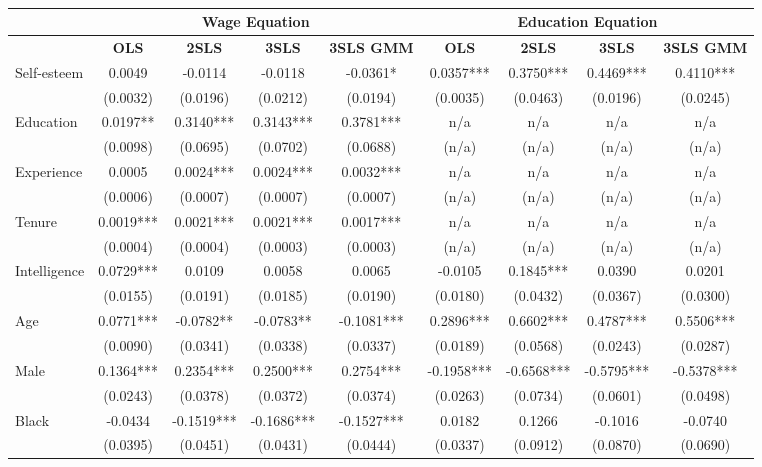 \documentclass[12pt]{report}
\newcommand{\prbf}[1]{\textbf{#1}}
\begin{document}
\begin{sidewaystable}
\small
\caption{\label{tab:wage80b}}
\vspace{2pt}
\centering\begin{tabular}{lc|c|c|c|c|c|c|c}
\hline
\hline
& \multicolumn{4}{|c|}{Wage Equation} & \multicolumn{4}{|c}{Education Equation}\\
\hline
& \prbf{OLS} & \prbf{2SLS} & \prbf{3SLS} & \prbf{3SLS GMM} & \prbf{OLS} & \prbf{2SLS} & \prbf{3SLS} & \prbf{3SLS GMM}\\
\hline
Self-esteem & 0.0049 & -0.0114 & -0.0118 & -0.0361* & 0.0357*** & 0.3750*** & 0.4469*** & 0.4110***\\
& (0.0032) & (0.0196) & (0.0212) & (0.0194) & (0.0035) & (0.0463) & (0.0196) & (0.0245)\\
Education & 0.0197** & 0.3140*** & 0.3143*** & 0.3781*** & n/a & n/a & n/a & n/a\\
& (0.0098) & (0.0695) & (0.0702) & (0.0688) & (n/a) & (n/a) & (n/a) & (n/a)\\
Experience & 0.0005 & 0.0024*** & 0.0024*** & 0.0032*** & n/a & n/a & n/a & n/a\\
& (0.0006) & (0.0007) & (0.0007) & (0.0007) & (n/a) & (n/a) & (n/a) & (n/a)\\
Tenure & 0.0019*** & 0.0021*** & 0.0021*** & 0.0017*** & n/a & n/a & n/a & n/a\\
& (0.0004) & (0.0004) & (0.0003) & (0.0003) & (n/a) & (n/a) & (n/a) & (n/a)\\
Intelligence & 0.0729*** & 0.0109 & 0.0058 & 0.0065 & -0.0105 & 0.1845*** & 0.0390 & 0.0201\\
& (0.0155) & (0.0191) & (0.0185) & (0.0190) & (0.0180) & (0.0432) & (0.0367) & (0.0300)\\
Age & 0.0771*** & -0.0782** & -0.0783** & -0.1081*** & 0.2896*** & 0.6602*** & 0.4787*** & 0.5506***\\
& (0.0090) & (0.0341) & (0.0338) & (0.0337) & (0.0189) & (0.0568) & (0.0243) & (0.0287)\\
Male & 0.1364*** & 0.2354*** & 0.2500*** & 0.2754*** & -0.1958*** & -0.6568*** & -0.5795*** & -0.5378***\\
& (0.0243) & (0.0378) & (0.0372) & (0.0374) & (0.0263) & (0.0734) & (0.0601) & (0.0498)\\
Black & -0.0434 & -0.1519*** & -0.1686*** & -0.1527*** & 0.0182 & 0.1266 & -0.1016 & -0.0740\\
& (0.0395) & (0.0451) & (0.0431) & (0.0444) & (0.0337) & (0.0912) & (0.0870) & (0.0690)\\

\end{tabular}
\end{sidewaystable}
\end{document}
